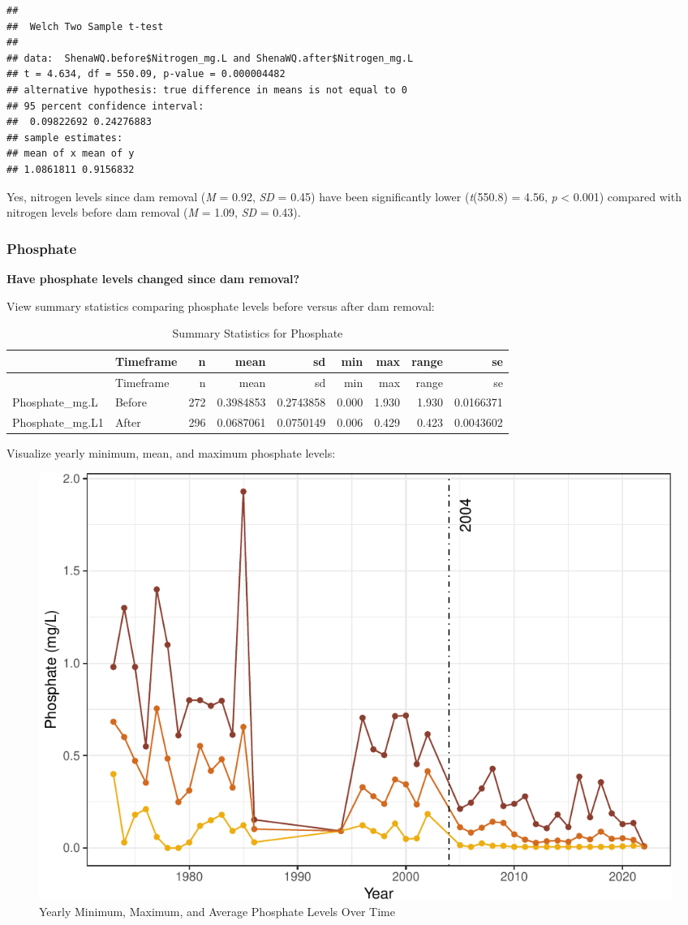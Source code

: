 \documentclass[
  12pt,
]{article}
\begin{document}
\begin{verbatim}
## 
##  Welch Two Sample t-test
## 
## data:  ShenaWQ.before$Nitrogen_mg.L and ShenaWQ.after$Nitrogen_mg.L
## t = 4.634, df = 550.09, p-value = 0.000004482
## alternative hypothesis: true difference in means is not equal to 0
## 95 percent confidence interval:
##  0.09822692 0.24276883
## sample estimates:
## mean of x mean of y 
## 1.0861811 0.9156832
\end{verbatim}

Yes, nitrogen levels since dam removal (\emph{M} = 0.92, \emph{SD} =
0.45) have been significantly lower (\emph{t}(550.8) = 4.56, \emph{p}
\textless{} 0.001) compared with nitrogen levels before dam removal
(\emph{M} = 1.09, \emph{SD} = 0.43).

\newpage

\hypertarget{phosphate}{%
\subsubsection{Phosphate}\label{phosphate}}

\textbf{Have phosphate levels changed since dam removal?}

View summary statistics comparing phosphate levels before versus after
dam removal:

\begin{longtable}[]{@{}llrrrrrrr@{}}
\caption{Summary Statistics for Phosphate}\tabularnewline
\toprule
& Timeframe & n & mean & sd & min & max & range & se \\
\midrule
\endfirsthead
\toprule
& Timeframe & n & mean & sd & min & max & range & se \\
\midrule
\endhead
Phosphate\_mg.L & Before & 272 & 0.3984853 & 0.2743858 & 0.000 & 1.930 &
1.930 & 0.0166371 \\
Phosphate\_mg.L1 & After & 296 & 0.0687061 & 0.0750149 & 0.006 & 0.429 &
0.423 & 0.0043602 \\
\bottomrule
\end{longtable}

Visualize yearly minimum, mean, and maximum phosphate levels:

\begin{figure}
\centering
\includegraphics{Project_Script_files/figure-latex/Phosphate_Analysis3-1.pdf}
\caption{Yearly Minimum, Maximum, and Average Phosphate Levels Over
Time}
\end{figure}
\end{document}
